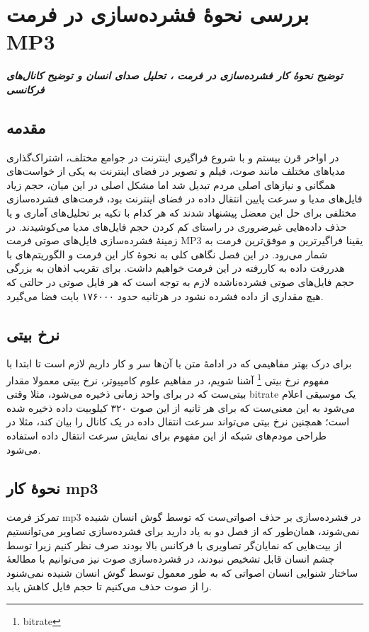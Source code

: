 \chapter{بررسی نحوهٔ فشرده‌سازی در فرمت MP3}
\noindent
\textbf{
	\textit{
        توضیح نحوهٔ کار فشرده‌سازی در فرمت ،
        تحلیل صدای انسان و توضیح کانال‌های فرکانسی
	}
}
\pagebreak

\section{ مقدمه}
در اواخر قرن بیستم و با شروع فراگیری اینترنت در جوامع مختلف، اشتراک‌گذاری 
مدیا‌های مختلف مانند صوت، فیلم و تصویر در فضای اینترنت به یکی از خواست‌های همگانی و نیازهای اصلی مردم تبدیل شد اما 
مشکل اصلی در این میان، حجم زیاد فایل‌های مدیا و سرعت پایین انتقال داده در فضای اینترنت بود، 
فرمت‌های فشرده‌سازی مختلفی برای حل این معضل پیشنهاد شدند که هر کدام با تکیه بر
تحلیل‌های آماری و یا حذف داده‌هایی غیرضروری در راستای کم کردن حجم فایل‌های مدیا می‌کوشیدند. در زمینهٔ  فشرده‌سازی فایل‌های
صوتی فرمت MP3 یقینا فراگیرترین و موفق‌ترین فرمت به شمار می‌رود. در این فصل 
نگاهی کلی به نحوهٔ کار این فرمت و الگوریتم‌های با هدررفت داده به کاررفته در این فرمت خواهیم داشت. برای تقریب اذهان به بزرگی حجم فایل‌های صوتی فشرده‌ناشده لازم به توجه است که هر
فایل صوتی در حالتی که هیچ مقداری از داده فشرده نشود در هرثانیه حدود ۱۷۶۰۰۰ بایت فضا می‌گیرد.

\section{نرخ بیتی } 
برای درک بهتر مفاهیمی که در ادامهٔ متن با آن‌ها سر و کار داریم لازم است تا ابتدا با مفهوم نرخ بیتی \footnote{bitrate} آشنا شویم، در مفاهیم علوم کامپیوتر، نرخ بیتی
معمولا  مقدار بیتی‌ست که در برای واحد زمانی ذخیره می‌شود، مثلا وقتی bitrate یک موسیقی 
اعلام می‌شود به این معنی‌ست که برای هر ثانیه از این صوت ۳۲۰ کیلوبیت داده ذخیره شده است؛ همچنین نرخ بیتی می‌تواند سرعت انتقال داده در یک
کانال را بیان کند،‌ مثلا در طراحی مودم‌های شبکه از این مفهوم برای نمایش سرعت انتقال داده استفاده می‌شود. 

\section{نحوهٔ کار mp3}
تمرکز فرمت mp3 در فشرده‌سازی 
بر حذف اصواتی‌ست که توسط گوش انسان شنیده نمی‌شوند،‌ همان‌طور که از فصل دو به یاد دارید برای فشرده‌سازی تصاویر می‌توانستیم از بیت‌هایی که 
نمایان‌گر تصاویری با فرکانس بالا بودند صرف نظر کنیم زیرا توسط چشم انسان قابل تشخیص نبودند،‌ در فشرده‌سازی صوت نیز می‌توانیم 
 با مطالعهٔ ساختار شنوایی انسان اصواتی که به طور معمول توسط گوش انسان شنیده نمی‌شنود را از صوت حذف می‌کنیم تا حجم فایل کاهش یابد.

